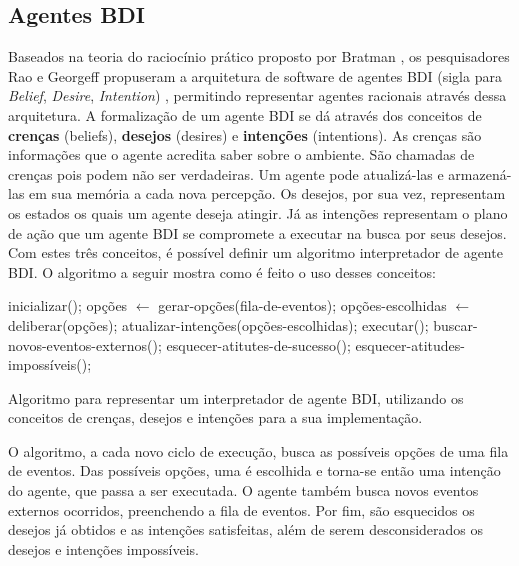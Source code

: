 \subsection{Agentes BDI}
Baseados na teoria do raciocínio prático proposto por Bratman \cite{Bratman87},
os pesquisadores Rao e Georgeff propuseram a arquitetura de software de agentes
BDI (sigla para \textit{Belief}, \textit{Desire}, \textit{Intention})
\cite{bdi-icmas95}, permitindo representar agentes racionais através dessa
arquitetura. A formalização de um agente BDI se dá através dos conceitos de \textbf{crenças}
(beliefs), \textbf{desejos} (desires) e \textbf{intenções} (intentions). As
crenças são informações que o agente acredita saber sobre o ambiente.
São chamadas de crenças pois podem não ser verdadeiras. Um agente pode
atualizá-las e armazená-las em sua memória a cada nova percepção. Os desejos,
por sua vez, representam os estados os quais um agente deseja atingir. Já as
intenções representam o plano de ação que um agente BDI se compromete a executar
na busca por seus desejos. Com estes três conceitos, é possível definir um
algoritmo interpretador de agente BDI. O algoritmo a seguir mostra como é feito
o uso desses conceitos:

\begin{algorithm}[htb]
\begin{center}
	\begin{algorithmic}[1]
        \STATE inicializar();
        \STATE {}
            \STATE opções $\gets$ gerar-opções(fila-de-eventos);
            \STATE opções-escolhidas $\gets$ deliberar(opções);
            \STATE atualizar-intenções(opções-escolhidas);
            \STATE executar();
            \STATE buscar-novos-eventos-externos();
            \STATE esquecer-atitutes-de-sucesso();
            \STATE esquecer-atitudes-impossíveis();
        \ENDWHILE
    \end{algorithmic}
\end{center}
\caption[Algoritmo para representar um interpretador de agente BDI.]
{\label{alg:BDIINTERPRETERALG} Algoritmo para representar um interpretador de
agente BDI, utilizando os conceitos de crenças, desejos e intenções para a sua
implementação.}
\end{algorithm}

O algoritmo, a cada novo ciclo de execução, busca as possíveis opções de uma
fila de eventos. Das possíveis opções, uma é escolhida e torna-se então uma
intenção do agente, que passa a ser executada. O agente também busca novos
eventos externos ocorridos, preenchendo a fila de eventos. Por fim, são
esquecidos os desejos já obtidos e as intenções satisfeitas, além de serem
desconsiderados os desejos e intenções impossíveis.

